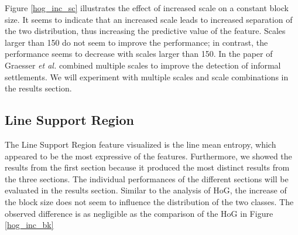 Figure \ref{hog_inc_sc} illustrates the effect of increased scale on a constant block size. It seems to indicate that an increased scale leads to increased separation of the two distribution, thus increasing the predictive value of the feature. Scales larger than 150 do not seem to improve the performance; in contrast, the performance seems to decrease with scales larger than 150. In the paper of Graesser \textit{et al.} combined multiple scales to improve the detection of informal settlements. We will experiment with multiple scales and scale combinations in the results section.

\subsection{Line Support Region}

The Line Support Region feature visualized is the line mean entropy, which appeared to be the most expressive of the features. Furthermore, we showed the results from the first section because it produced the most distinct results from the three sections. The individual performances of the different sections will be evaluated in the results section. Similar to the analysis of HoG, the increase of the block size does not seem to influence the distribution of the two classes. The observed difference is as negligible as the comparison of the HoG in Figure \ref{hog_inc_bk}

